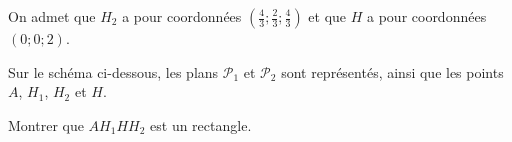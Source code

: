 \begin{enumerate}[resume]
	On admet que $H_2$ a pour coordonnées $\left(\frac43;\frac23;\frac43\right)$ et que $H$ a pour coordonnées $(0;0;2)$.
	
	\medskip
	
	Sur le schéma ci-dessous, les plans $\mathcal{P}_1$ et $\mathcal{P}_2$ sont représentés, ainsi que les points $A$, $H_1$, $H_2$ et $H$.
	
	\medskip
	
	Montrer que $AH_1HH_2$ est un rectangle.
\end{enumerate}
